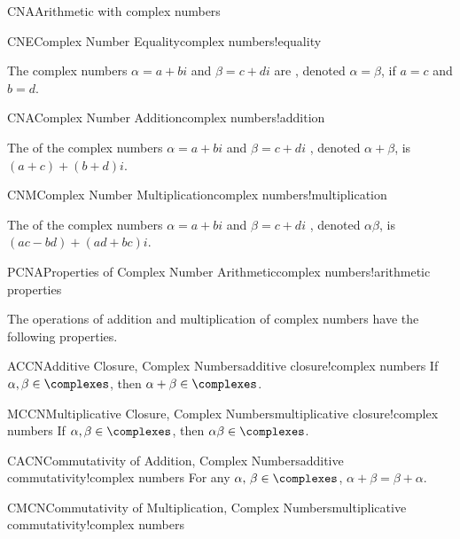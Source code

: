\begin{subsect}{CNA}{Arithmetic with complex numbers}
%
\begin{definition}{CNE}{Complex Number Equality}{complex numbers!equality}
\begin{para}The complex numbers $\alpha=a+bi$ and $\beta=c+di$ are , denoted $\alpha=\beta$, if $a=c$ and $b=d$.\end{para}
\end{definition}
%
%
\begin{definition}{CNA}{Complex Number Addition}{complex numbers!addition}
\begin{para}The  of the complex numbers $\alpha=a+bi$ and $\beta=c+di$ , denoted $\alpha+\beta$, is $(a+c)+(b+d)i$.\end{para}
\end{definition}
%
%
\begin{definition}{CNM}{Complex Number Multiplication}{complex numbers!multiplication}
\begin{para}The  of the complex numbers $\alpha=a+bi$ and $\beta=c+di$ , denoted $\alpha\beta$, is $(ac-bd)+(ad+bc)i$.\end{para}
\end{definition}
%
\begin{theorem}{PCNA}{Properties of Complex Number Arithmetic}{complex numbers!arithmetic properties}
\begin{para}The operations of addition and multiplication of complex numbers have the following properties.
%
\begin{propertylist}
%
\begin{property}{ACCN}{Additive Closure, Complex Numbers}{additive closure!complex numbers}
If $\alpha,\beta\in\complexes$, then $\alpha+\beta\in\complexes$.\end{property}
%
\begin{property}{MCCN}{Multiplicative Closure, Complex Numbers}{multiplicative closure!complex numbers}
If $\alpha,\beta\in\complexes$, then $\alpha\beta\in\complexes$.\end{property}
%
\begin{property}{CACN}{Commutativity of Addition, Complex Numbers}{additive commutativity!complex numbers}
For any $\alpha,\,\beta\in\complexes$, $\alpha+\beta=\beta+\alpha$.\end{property}
%
\begin{property}{CMCN}{Commutativity of Multiplication, Complex Numbers}{multiplicative commutativity!complex numbers}

\end{property}
\end{propertylist}
\end{para}
\end{theorem}
\end{subsect}
